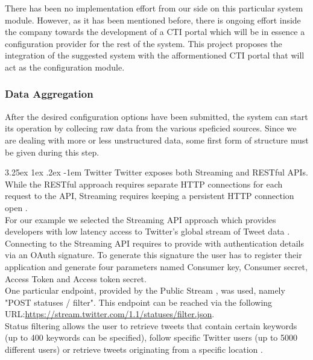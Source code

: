 \documentclass[12pt]{article}
\makeatletter
\newcounter{subsubsubsection}[subsubsection]
\renewcommand\paragraph{\@startsection{paragraph}{5}{\z@}%
  {3.25ex \@plus1ex \@minus.2ex}%
  {-1em}%
  {\normalfont\normalsize\bfseries}}
\makeatother
\begin{document}
There has been no implementation effort from our side on this particular system module. However, as it has been mentioned before, there is ongoing effort inside the company towards the development of a CTI portal which will be in essence a configuration provider for the rest of the system. This project proposes the integration of the suggested system with the afformentioned CTI portal that will act as the configuration module. 


\subsubsection{Data Aggregation}
After the desired configuration options have been submitted, the  system can start its operation by collecing raw data from the various speficied sources. Since we are dealing with more or less unstructured data, some first form of structure must be given during this step.





\paragraph{Twitter}
\hfill \break
Twitter exposes both Streaming and RESTful APIs. While the RESTful approach requires separate HTTP connections for each request to the API, Streaming requires keeping a persistent HTTP connection open \cite{twitteroverview}.\\

For our example we selected the Streaming API approach which provides developers with low latency access to Twitter’s global stream of Tweet data \cite{twitteroverview}.\\

Connecting to the Streaming API requires to provide with authentication details via an OAuth signature. To generate this signature the user has to register their application and generate four parameters named Consumer key, Consumer secret, Access Token and Access token secret.\\

One particular endpoint, provided by the Public Stream \cite{twitterpublic}, was used, namely "POST statuses / filter". This endpoint can be reached via the following URL:\url{https://stream.twitter.com/1.1/statuses/filter.json}.\\

Status filtering allows the user to retrieve tweets that contain certain keywords (up to 400 keywords can be specified), follow specific Twitter users (up to 5000 different users) or retrieve tweets originating from a specific location \cite{twitterfilter}.\\
\end{document}
